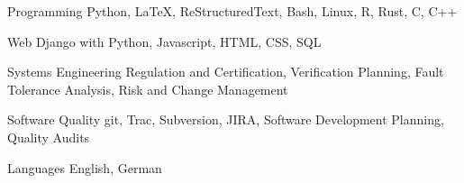 


\begin{cvskills}


\cvskill
{Programming} %
{Python, \LaTeX, ReStructuredText, Bash, Linux, R, Rust, C, C++} %


\cvskill
{Web} %
{Django with Python, Javascript, HTML, CSS, SQL} %


\cvskill
{Systems Engineering}
{Regulation and Certification, Verification Planning, Fault Tolerance
 Analysis, Risk and Change Management}

\cvskill
{Software Quality}
{git, Trac, Subversion, JIRA, Software Development Planning, Quality Audits}


\cvskill
{Languages} %
{English, German} %


\end{cvskills}